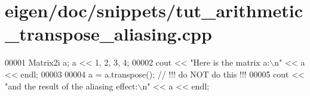 \hypertarget{eigen_2doc_2snippets_2tut__arithmetic__transpose__aliasing_8cpp_source}{}\section{eigen/doc/snippets/tut\+\_\+arithmetic\+\_\+transpose\+\_\+aliasing.cpp}
\label{eigen_2doc_2snippets_2tut__arithmetic__transpose__aliasing_8cpp_source}

\begin{DoxyCode}
00001 Matrix2i a; a << 1, 2, 3, 4;
00002 cout << \textcolor{stringliteral}{"Here is the matrix a:\(\backslash\)n"} << a << endl;
00003 
00004 a = a.transpose(); \textcolor{comment}{// !!! do NOT do this !!!}
00005 cout << \textcolor{stringliteral}{"and the result of the aliasing effect:\(\backslash\)n"} << a << endl;
\end{DoxyCode}
